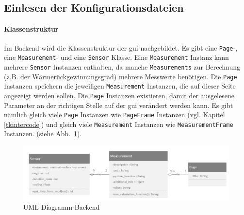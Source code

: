\subsection{Einlesen der Konfigurationsdateien} \label{einlesen_konfigurationsdateien}
\paragraph{Klassenstruktur}
Im Backend wird die Klassenstruktur der \ac{gui} nachgebildet. Es gibt eine \lstinline{Page}-, eine \lstinline{Measurement}- und eine \lstinline{Sensor} Klasse. Eine \lstinline{Measurement} Instanz kann mehrere \lstinline{Sensor} Instanzen enthalten, da manche \lstinline{Measurements} zur Berechnung (z.B. der Wärmerückgewinnungsgrad) mehrere Messwerte benötigen. Die \lstinline{Page} Instanzen speichern die jeweiligen \lstinline{Measurement} Instanzen, die auf dieser Seite angezeigt werden sollen. Die \lstinline{Page} Instanzen existieren, damit der ausgelesene Parameter an der richtigen Stelle auf der \acs{gui} verändert werden kann. Es gibt nämlich gleich viele \lstinline{Page} Instanzen wie \lstinline{PageFrame} Instanzen (vgl. Kapitel \ref{tkintercode}) und gleich viele \lstinline{Measurement} Instanzen wie \lstinline{MeasurementFrame} Instanzen. (siehe Abb.~\ref{fig:uml_backend}).
\begin{figure}[ht]
	\centering
	\includegraphics[width=1.0\linewidth]{Bilder/UML_Backend}
	\caption{UML Diagramm Backend}
	\label{fig:uml_backend}
\end{figure}

